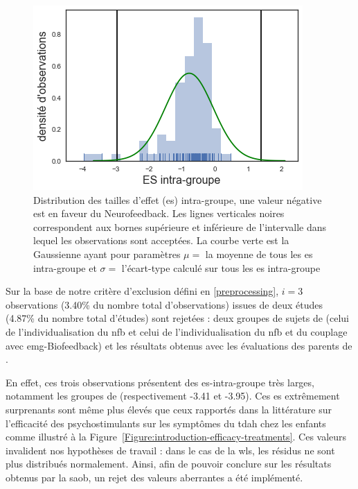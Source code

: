 \begin{figure}[h!]
  \centering
	\includegraphics[width=0.7\linewidth]{figures/chapter-3/distribution-ES-within} 
  \caption{Distribution des tailles d'effet (\gls{es}) intra-groupe, une valeur négative est en faveur du Neurofeedback. Les lignes 
	verticales noires correspondent aux bornes supérieure et 
	inférieure de l'intervalle dans lequel les observations sont acceptées. La courbe verte est la Gaussienne ayant pour paramètres $\mu =$ la moyenne
	de tous les \gls{es} intra-groupe et $\sigma =$ l'écart-type calculé sur tous les \gls{es} intra-groupe}
  \label{Figure:distribution_ES_within}
\end{figure}

Sur la base de notre critère d'exclusion défini en \ref{preprocessing}, $i = 3$ observations (3.40\% du nombre total d'observations) issues de deux études (4.87\% du nombre total d'études) 
sont rejetées : deux groupes de sujets de \citet{Bazanova2018} (celui de l'individualisation du \gls{nfb} et 
celui de l'individualisation du \gls{nfb} et du couplage avec \gls{emg}-Biofeedback) et les résultats obtenus avec les évaluations des 
parents de \citet{Rajabi2019}. 

En effet, ces trois observations présentent des \gls{es}-intra-groupe très larges, notamment les groupes de \citet{Bazanova2018} 
(respectivement -3.41 et -3.95). Ces \gls{es} extrêmement surprenants sont même plus élevés que ceux rapportés dans la littérature sur l'efficacité 
des psychostimulants sur les symptômes du \gls{tdah} chez les enfants \citep{Luan2017} comme illustré à la Figure~\ref{Figure:introduction-efficacy-treatments}. 
Ces valeurs invalident nos hypothèses de travail : dans le cas de la 
\gls{wls}, les résidus ne sont plus distribués normalement. Ainsi, afin de pouvoir conclure sur les résultats obtenus par la \gls{saob}, 
un rejet des valeurs aberrantes a été implémenté.

